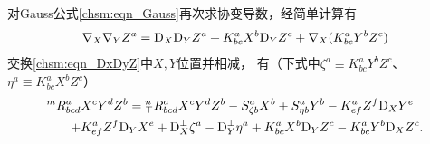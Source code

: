 对Gauss公式\eqref{chsm:eqn_Gauss}再次求协变导数，经简单计算有
\begin{equation}\label{chsm:eqn_DxDyZ}
    {\nabla}_{X} {\nabla}_{Y} Z^a = {\rm D}_{X} {\rm D}_{Y} Z^a
      + K^a_{bc} X^b {\rm D}_{Y} Z^c + {\nabla}_{X} ( K^a_{bc} Y^b Z^c )
\end{equation}
交换\eqref{chsm:eqn_DxDyZ}中$X,Y$位置并相减，
有（下式中$\zeta^a\equiv K^{a}_{bc} Y^b Z^c$、$\eta^a\equiv K^{a}_{bc} X^b Z^c$）
\begin{align}
    {}^{m}{R}^a_{bcd}& X^c Y^d Z^b %
    = {}^{n}_{\top}{R}^a_{bcd} X^c Y^d Z^b - S^a_{\zeta b} X^b + S^a_{\eta b} Y^b
    - K^a_{ef} Z^f {\rm D}_{X} Y^e   \notag \\
    +& K^a_{ef} Z^f {\rm D}_{Y} X^e + {\rm D}^\bot_{X} \zeta^{a} -{\rm D}^\bot_{Y} \eta^a
    + K^{a}_{bc}X^b {\rm D}_{Y}Z^c - K^{a}_{bc}Y^b {\rm D}_{X}Z^c. \label{chsm:eqn_gwcr}
\end{align}
